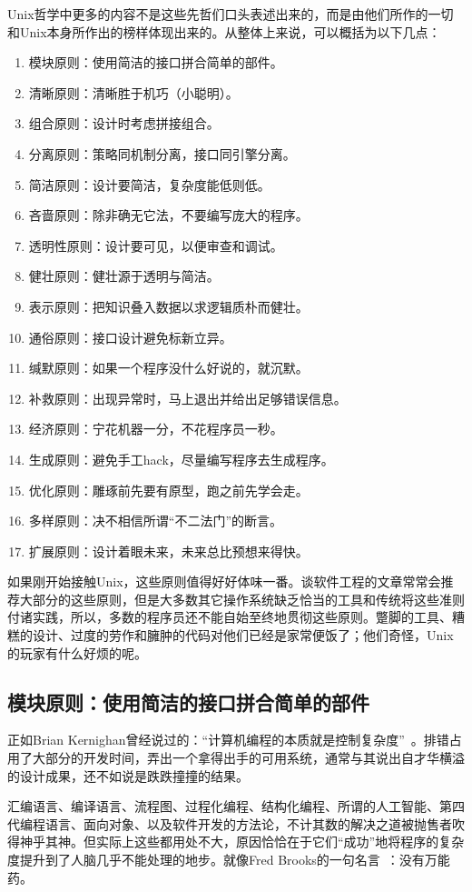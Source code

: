 \documentclass[12pt,oneside]{ctexbook}
\begin{document}
\begin{common-format}
Unix哲学中更多的内容不是这些先哲们口头表述出来的，而是由他们所作的一切和Unix本身所作出的榜样体现出来的。从整体上来说，可以概括为以下几点：
\begin{enumerate}
\item 模块原则：使用简洁的接口拼合简单的部件。
\item 清晰原则：清晰胜于机巧（小聪明）。
\item 组合原则：设计时考虑拼接组合。
\item 分离原则：策略同机制分离，接口同引擎分离。
\item 简洁原则：设计要简洁，复杂度能低则低。
\item 吝啬原则：除非确无它法，不要编写庞大的程序。
\item 透明性原则：设计要可见，以便审查和调试。
\item 健壮原则：健壮源于透明与简洁。
\item 表示原则：把知识叠入数据以求逻辑质朴而健壮。
\item 通俗原则：接口设计避免标新立异。
\item 缄默原则：如果一个程序没什么好说的，就沉默。
\item 补救原则：出现异常时，马上退出并给出足够错误信息。
\item 经济原则：宁花机器一分，不花程序员一秒。
\item 生成原则：避免手工hack，尽量编写程序去生成程序。
\item 优化原则：雕琢前先要有原型，跑之前先学会走。
\item 多样原则：决不相信所谓“不二法门”的断言。
\item 扩展原则：设计着眼未来，未来总比预想来得快。
\end{enumerate}

如果刚开始接触Unix，这些原则值得好好体味一番。谈软件工程的文章常常会推荐大部分的这些原则，但是大多数其它操作系统缺乏恰当的工具和传统将这些准则付诸实践，所以，多数的程序员还不能自始至终地贯彻这些原则。蹩脚的工具、糟糕的设计、过度的劳作和臃肿的代码对他们已经是家常便饭了；他们奇怪，Unix的玩家有什么好烦的呢。


\subsection{模块原则：使用简洁的接口拼合简单的部件}
正如Brian Kernighan曾经说过的：“计算机编程的本质就是控制复杂度”~\cite{Kernighan-Plauger}。排错占用了大部分的开发时间，弄出一个拿得出手的可用系统，通常与其说出自才华横溢的设计成果，还不如说是跌跌撞撞的结果。

汇编语言、编译语言、流程图、过程化编程、结构化编程、所谓的人工智能、第四代编程语言、面向对象、以及软件开发的方法论，不计其数的解决之道被抛售者吹得神乎其神。但实际上这些都用处不大，原因恰恰在于它们“成功”地将程序的复杂度提升到了人脑几乎不能处理的地步。就像Fred Brooks的一句名言~\cite{Brooks}：没有万能药。


\end{common-format}
\end{document}
